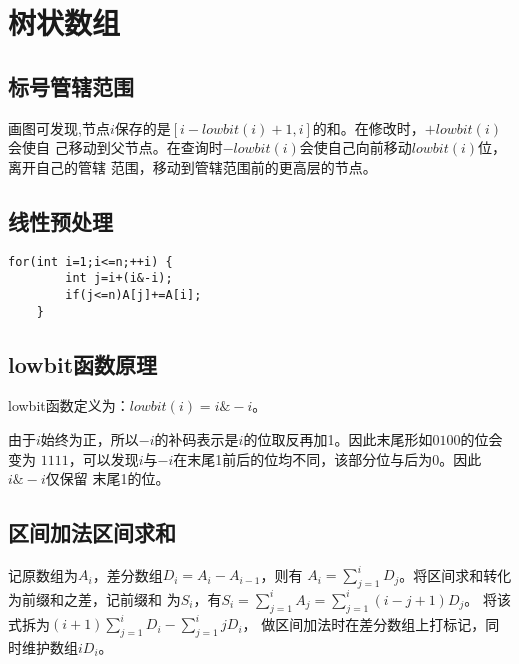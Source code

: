 \section{树状数组}
\subsection{标号管辖范围}

画图可发现,节点$i$保存的是$[i-lowbit(i)+1,i]$的和。在修改时，$+lowbit(i)$会使自
己移动到父节点。在查询时$-lowbit(i)$会使自己向前移动$lowbit(i)$位，离开自己的管辖
范围，移动到管辖范围前的更高层的节点。

\subsection{线性预处理}

\begin{lstlisting}[title=LinearBuild]
    for(int i=1;i<=n;++i) {
        int j=i+(i&-i);
        if(j<=n)A[j]+=A[i];
    }
\end{lstlisting}

\subsection{lowbit函数原理}

lowbit函数定义为：$lowbit(i)=i\&-i$。

由于$i$始终为正，所以$-i$的补码表示是$i$的位取反再加1。因此末尾形如$0100$的位会变为
$1111$，可以发现$i$与$-i$在末尾1前后的位均不同，该部分位与后为0。因此$i\&-i$仅保留
末尾1的位。
\subsection{区间加法区间求和}
记原数组为$A_i$，差分数组$D_i=A_i-A_{i-1}$，则有
$\displaystyle A_i=\sum_{j=1}^i{D_j}$。将区间求和转化为前缀和之差，记前缀和
为$S_i$，有$\displaystyle S_i=\sum_{j=1}^i{A_j}=\sum_{j=1}^i{(i-j+1)D_j}$。
将该式拆为$\displaystyle (i+1)\sum_{j=1}^i{D_i}-\sum_{j=1}^i{jD_i}$，
做区间加法时在差分数组上打标记，同时维护数组$iD_i$。
